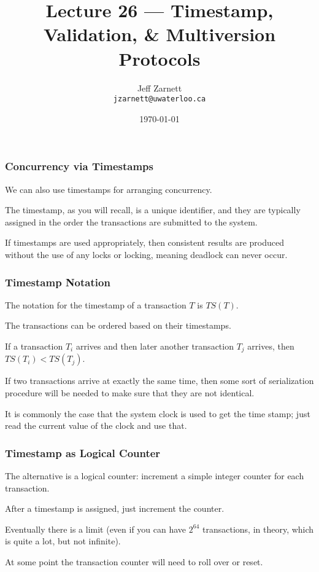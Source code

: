 

\title{Lecture  26 --- Timestamp, Validation, \& Multiversion Protocols }

\author{Jeff Zarnett \\ \small \texttt{jzarnett@uwaterloo.ca}}
\date{\today}




\begin{frame}
  \titlepage

 \end{frame}


\begin{frame}
\frametitle{Concurrency via Timestamps}

We can also use timestamps for arranging concurrency. 

The timestamp, as you will recall, is a unique identifier, and they are typically assigned in the order the transactions are submitted to the system. 

If timestamps are used appropriately, then consistent results are produced without the use of any locks or locking, meaning deadlock can never occur.

\end{frame}

\begin{frame}
\frametitle{Timestamp Notation}
The notation for the timestamp of a transaction $T$ is $T\!S(T)$. 

The transactions can be ordered based on their timestamps. 

If a transaction $T_{i}$ arrives and then later another transaction $T_{j}$ arrives, then $T\!S(T_{i}) < T\!S(T_{j})$. 

If two transactions arrive at exactly the same time, then some sort of serialization procedure will be needed to make sure that they are not identical. 

It is commonly the case that the system clock is used to get the time stamp; just read the current value of the clock and use that.


\end{frame}

\begin{frame}
\frametitle{Timestamp as Logical Counter}

The alternative is a logical counter: increment a simple integer counter for each transaction. 

After a timestamp is assigned, just increment the counter. 

Eventually there is a limit (even if you can have $2^{64}$ transactions, in theory, which is quite a lot, but not infinite).

At some point the transaction counter will need to roll over or reset.

\end{frame}


